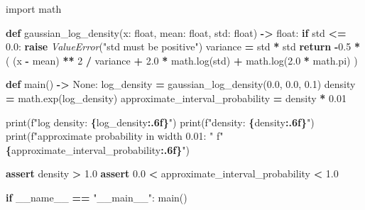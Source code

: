 \documentclass[
  american,
  11pt,
  letterpaper,
]{article}
\newenvironment{Shaded}{\begin{snugshade}}{\end{snugshade}}
\newcommand{\BuiltInTok}[1]{#1}
\newcommand{\ControlFlowTok}[1]{\textcolor[rgb]{0.13,0.29,0.53}{\textbf{#1}}}
\newcommand{\DecValTok}[1]{\textcolor[rgb]{0.00,0.00,0.81}{#1}}
\newcommand{\FloatTok}[1]{\textcolor[rgb]{0.00,0.00,0.81}{#1}}
\newcommand{\ImportTok}[1]{#1}
\newcommand{\KeywordTok}[1]{\textcolor[rgb]{0.13,0.29,0.53}{\textbf{#1}}}
\newcommand{\NormalTok}[1]{#1}
\newcommand{\OperatorTok}[1]{\textcolor[rgb]{0.81,0.36,0.00}{\textbf{#1}}}
\newcommand{\PreprocessorTok}[1]{\textcolor[rgb]{0.56,0.35,0.01}{\textit{#1}}}
\newcommand{\SpecialCharTok}[1]{\textcolor[rgb]{0.81,0.36,0.00}{\textbf{#1}}}
\newcommand{\SpecialStringTok}[1]{\textcolor[rgb]{0.31,0.60,0.02}{#1}}
\newcommand{\StringTok}[1]{\textcolor[rgb]{0.31,0.60,0.02}{#1}}
\newcommand{\VariableTok}[1]{\textcolor[rgb]{0.00,0.00,0.00}{#1}}
\renewenvironment{Shaded}{\par\smallskip}{\par\smallskip}
\begin{document}
\begin{Shaded}
\begin{Highlighting}[]
\ImportTok{import}\NormalTok{ math}


\KeywordTok{def}\NormalTok{ gaussian\_log\_density(x: }\BuiltInTok{float}\NormalTok{, mean: }\BuiltInTok{float}\NormalTok{, std: }\BuiltInTok{float}\NormalTok{) }\OperatorTok{{-}\textgreater{}} \BuiltInTok{float}\NormalTok{:}
    \ControlFlowTok{if}\NormalTok{ std }\OperatorTok{\textless{}=} \FloatTok{0.0}\NormalTok{:}
        \ControlFlowTok{raise} \PreprocessorTok{ValueError}\NormalTok{(}\StringTok{"std must be positive"}\NormalTok{)}
\NormalTok{    variance }\OperatorTok{=}\NormalTok{ std }\OperatorTok{*}\NormalTok{ std}
    \ControlFlowTok{return} \OperatorTok{{-}}\FloatTok{0.5} \OperatorTok{*}\NormalTok{ (}
\NormalTok{        (x }\OperatorTok{{-}}\NormalTok{ mean) }\OperatorTok{**} \DecValTok{2} \OperatorTok{/}\NormalTok{ variance}
        \OperatorTok{+} \FloatTok{2.0} \OperatorTok{*}\NormalTok{ math.log(std)}
        \OperatorTok{+}\NormalTok{ math.log(}\FloatTok{2.0} \OperatorTok{*}\NormalTok{ math.pi)}
\NormalTok{    )}


\KeywordTok{def}\NormalTok{ main() }\OperatorTok{{-}\textgreater{}} \VariableTok{None}\NormalTok{:}
\NormalTok{    log\_density }\OperatorTok{=}\NormalTok{ gaussian\_log\_density(}\FloatTok{0.0}\NormalTok{, }\FloatTok{0.0}\NormalTok{, }\FloatTok{0.1}\NormalTok{)}
\NormalTok{    density }\OperatorTok{=}\NormalTok{ math.exp(log\_density)}
\NormalTok{    approximate\_interval\_probability }\OperatorTok{=}\NormalTok{ density }\OperatorTok{*} \FloatTok{0.01}

    \BuiltInTok{print}\NormalTok{(}\SpecialStringTok{f"log density: }\SpecialCharTok{\{}\NormalTok{log\_density}\SpecialCharTok{:.6f\}}\SpecialStringTok{"}\NormalTok{)}
    \BuiltInTok{print}\NormalTok{(}\SpecialStringTok{f"density: }\SpecialCharTok{\{}\NormalTok{density}\SpecialCharTok{:.6f\}}\SpecialStringTok{"}\NormalTok{)}
    \BuiltInTok{print}\NormalTok{(}\SpecialStringTok{f"approximate probability in width 0.01: "}
          \SpecialStringTok{f"}\SpecialCharTok{\{}\NormalTok{approximate\_interval\_probability}\SpecialCharTok{:.6f\}}\SpecialStringTok{"}\NormalTok{)}

    \ControlFlowTok{assert}\NormalTok{ density }\OperatorTok{\textgreater{}} \FloatTok{1.0}
    \ControlFlowTok{assert} \FloatTok{0.0} \OperatorTok{\textless{}}\NormalTok{ approximate\_interval\_probability }\OperatorTok{\textless{}} \FloatTok{1.0}


\ControlFlowTok{if} \VariableTok{\_\_name\_\_} \OperatorTok{==} \StringTok{"\_\_main\_\_"}\NormalTok{:}
\NormalTok{    main()}
\end{Highlighting}
\end{Shaded}
\end{document}
